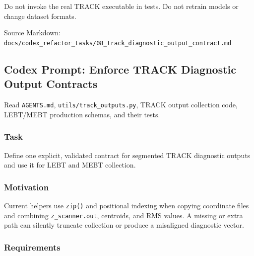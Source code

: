 \documentclass[
]{article}
\begin{document}
Do not invoke the real TRACK executable in tests. Do not retrain models
or change dataset formats.

Source Markdown:
\texttt{docs/codex\_refactor\_tasks/08\_track\_diagnostic\_output\_contract.md}

\hypertarget{codex-prompt-enforce-track-diagnostic-output-contracts}{%
\subsection{Codex Prompt: Enforce TRACK Diagnostic Output
Contracts}\label{codex-prompt-enforce-track-diagnostic-output-contracts}}

Read \texttt{AGENTS.md}, \texttt{utils/track\_outputs.py}, TRACK output
collection code, LEBT/MEBT production schemas, and their tests.

\hypertarget{task-7}{%
\subsubsection{Task}\label{task-7}}

Define one explicit, validated contract for segmented TRACK diagnostic
outputs and use it for LEBT and MEBT collection.

\hypertarget{motivation-1}{%
\subsubsection{Motivation}\label{motivation-1}}

Current helpers use \texttt{zip()} and positional indexing when copying
coordinate files and combining \texttt{z\_scanner.out}, centroids, and
RMS values. A missing or extra path can silently truncate collection or
produce a misaligned diagnostic vector.

\hypertarget{requirements-7}{%
\subsubsection{Requirements}\label{requirements-7}}
\end{document}
